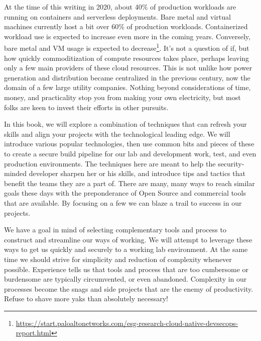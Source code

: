 \justify
At the time of this writing in 2020, about 40\% of production workloads are running on containers and serverless deployments. Bare metal and virtual machines currently host a bit over 60\% of production workloads.
Containerized workload use is expected to increase even more in the coming years. Conversely, bare metal and VM usage is expected to
 decrease\footnote{\url{https://start.paloaltonetworks.com/esg-research-cloud-native-devsecops-report.html}}. It's not a question of if, but how quickly commoditization of compute resources takes place, perhaps leaving only a few main providers of these cloud resources. This is not unlike how power generation and
distribution became centralized in the previous century, now the domain of a few large utility companies. Nothing beyond considerations of time, money, and practicality stop you from making your own electricity, but
most folks are keen to invest their efforts in other pursuits.

\justify
In this book, we will explore a combination of techniques that can refresh your skills and align your projects with the technological leading edge. We will introduce various popular technologies, then use
common bits and pieces of these to create a secure build pipeline for our lab and development work, test, and even production environments. The techniques here are meant to help the security-minded developer
sharpen her or his skills, and introduce tips and tactics that benefit the teams they are a part of. There are many, many ways to reach similar goals these days with the preponderance of Open Source and commercial tools that are available. By focusing on a few we can blaze a trail to success in our projects.

\justify
We have a goal in mind of selecting complementary tools and process to construct and streamline our ways of working. We will attempt to leverage these ways to get us quickly and securely to a working lab
environment. At the same time we should strive for simplicity and reduction of complexity whenever possible. Experience tells us that tools and process that are too cumbersome or burdensome are typically
circumvented, or even abandoned. Complexity in our processes become the snags and side projects that are the enemy of productivity. Refuse to shave more yaks than absolutely necessary!
